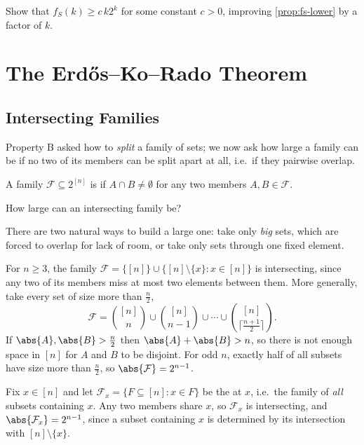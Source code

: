 \begin{exercise}
    Show that \(f_S(k) \ge c \, k 2^k\) for some constant \(c > 0\), improving \autoref{prop:fs-lower} by a factor of \(k\).
\end{exercise}

\section{The Erd\H{o}s--Ko--Rado Theorem}\label{sec:ekr}

\subsection{Intersecting Families}

Property B asked how to \emph{split} a family of sets; we now ask how large a family can be if no two of its members can be split apart at all, i.e.\ if they pairwise overlap.

\begin{definition}
    A family \(\mathcal{F} \subseteq 2^{[n]}\) is  if \(A \cap B \ne \emptyset\) for any two members \(A, B \in \mathcal{F}\).
\end{definition}

\begin{question}
    How large can an intersecting family be?
\end{question}

There are two natural ways to build a large one: take only \emph{big} sets, which are forced to overlap for lack of room, or take only sets through one fixed element.

\begin{eg}\label{eg:ekr-large}
    For \(n \ge 3\), the family \(\mathcal{F} = \{[n]\} \cup \bigl\{ [n] \setminus \{x\} : x \in [n] \bigr\}\) is intersecting, since any two of its members miss at most two elements between them. More generally, take every set of size more than \(\frac{n}{2}\),
    \[
        \mathcal{F} = \binom{[n]}{n} \cup \binom{[n]}{n-1} \cup \cdots \cup \binom{[n]}{\lceil \frac{n+1}{2} \rceil}.
    \]
    If \(\abs{A}, \abs{B} > \frac{n}{2}\) then \(\abs{A} + \abs{B} > n\), so there is not enough space in \([n]\) for \(A\) and \(B\) to be disjoint. For odd \(n\), exactly half of all subsets have size more than \(\frac{n}{2}\), so \(\abs{\mathcal{F}} = 2^{n-1}\).
\end{eg}

\begin{eg}[Stars]\label{eg:ekr-star}
    Fix \(x \in [n]\) and let \(\mathcal{F}_x = \{F \subseteq [n] : x \in F\}\) be the  at \(x\), i.e.\ the family of \emph{all} subsets containing \(x\). Any two members share \(x\), so \(\mathcal{F}_x\) is intersecting, and \(\abs{\mathcal{F}_x} = 2^{n-1}\), since a subset containing \(x\) is determined by its intersection with \([n] \setminus \{x\}\).
\end{eg}

